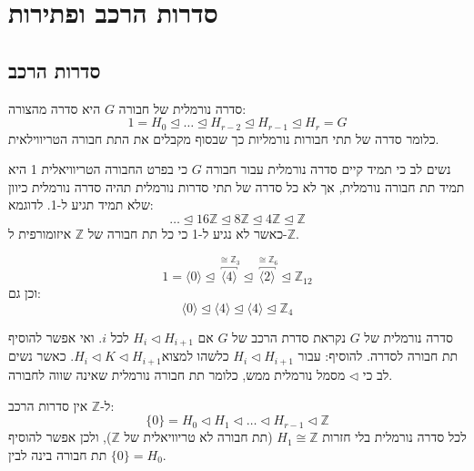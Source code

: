 \documentclass{tstextbook}
\begin{document}
\chapter{סדרות הרכב ופתירות}

\section{סדרות הרכב}

\begin{definition}
סדרה נורמלית של חבורה \(G\) היא סדרה מהצורה:
$$1=H_{0}\trianglelefteq \dots \trianglelefteq H_{r-2}\trianglelefteq H_{r-1}\trianglelefteq H_{r}=G$$
כלומר סדרה של תתי חבורות נורמליות כך שבסוף מקבלים את התת חבורה הטריווילאית.

\end{definition}
\begin{remark}
נשים לב כי תמיד קיים סדרה נורמלית עבור חבורה \(G\) כי בפרט החבורה הטריוויאלית 1 היא תמיד תת חבורה נורמלית, אך לא כל סדרה של תתי סדרות נורמלית תהיה סדרה נורמלית כיוון שלא תמיד תגיע ל-1. לדוגמא:
$$\dots \trianglelefteq 16\mathbb{Z}\trianglelefteq 8\mathbb{Z} \trianglelefteq 4\mathbb{Z}  \trianglelefteq \mathbb{Z}$$
כאשר לא נגיע ל-1 כי כל תת חבורה של \(\mathbb{Z}\) איזומורפית ל-\(\mathbb{Z}\).

\end{remark}
\begin{example}
$$1=\langle 0\rangle \trianglelefteq \overbracket{ \langle 4\rangle }^{ \cong \mathbb{Z} _{3} } \trianglelefteq \overbracket{ \langle 2\rangle  }^{ \cong \mathbb{Z} _{6} } \trianglelefteq \mathbb{Z} _{12}$$
וכן גם:
$$\langle 0\rangle \trianglelefteq \langle 4\rangle \trianglelefteq  \langle 4\rangle \trianglelefteq  \mathbb{Z} _{4}$$

\end{example}
\begin{definition}
סדרה נורמלית של \(G\) נקראת סדרת הרכב של \(G\) אם \(H_{i}\triangleleft H_{i+1}\) לכל \(i\). ואי אפשר להוסיף תת חבורה לסדרה.
להוסיף: עבור \(H_{i}\triangleleft H_{i+1}\) כלשהו למצוא\(H_{i}\triangleleft K\triangleleft H_{i+1}\). כאשר נשים לב כי \(\triangleleft\) מסמל נורמלית ממש, כלומר תת חבורה נורמלית שאינה שווה לחבורה.

\end{definition}
\begin{corollary}
ל-\(\mathbb{Z}\) אין סדרות הרכב:
$$\{ 0 \}=H_{0}\triangleleft H_{1}\triangleleft \dots \triangleleft H_{r-1}\triangleleft \mathbb{Z}$$
לכל סדרה נורמלית בלי חזרות \(H_{1}\cong\mathbb{Z}\) (תת חבורה לא טריוויאלית של \(\mathbb{Z}\)), ולכן אפשר להוסיף תת חבורה בינה לבין \(\{ 0 \}=H_{0}\).

\end{corollary}
\end{document}
